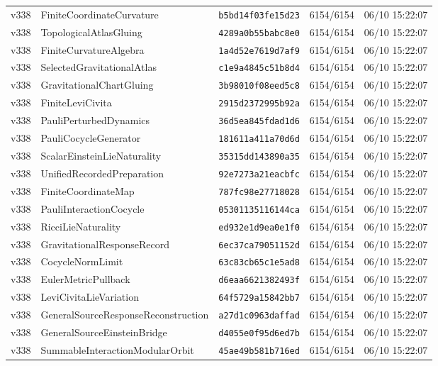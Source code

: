 \documentclass[11pt]{article}
\theoremstyle{definition}\newtheorem{deriv}{Derivação}
\begin{document}
{\begin{longtable}{@{}lllll@{}}
v338 & FiniteCoordinateCurvature & \texttt{b5bd14f03fe15d23} & 6154/6154 & 06/10 15:22:07 \\
v338 & TopologicalAtlasGluing & \texttt{4289a0b55babc8e0} & 6154/6154 & 06/10 15:22:07 \\
v338 & FiniteCurvatureAlgebra & \texttt{1a4d52e7619d7af9} & 6154/6154 & 06/10 15:22:07 \\
v338 & SelectedGravitationalAtlas & \texttt{c1e9a4845c51b8d4} & 6154/6154 & 06/10 15:22:07 \\
v338 & GravitationalChartGluing & \texttt{3b98010f08eed5c8} & 6154/6154 & 06/10 15:22:07 \\
v338 & FiniteLeviCivita & \texttt{2915d2372995b92a} & 6154/6154 & 06/10 15:22:07 \\
v338 & PauliPerturbedDynamics & \texttt{36d5ea845fdad1d6} & 6154/6154 & 06/10 15:22:07 \\
v338 & PauliCocycleGenerator & \texttt{181611a411a70d6d} & 6154/6154 & 06/10 15:22:07 \\
v338 & ScalarEinsteinLieNaturality & \texttt{35315dd143890a35} & 6154/6154 & 06/10 15:22:07 \\
v338 & UnifiedRecordedPreparation & \texttt{92e7273a21eacbfc} & 6154/6154 & 06/10 15:22:07 \\
v338 & FiniteCoordinateMap & \texttt{787fc98e27718028} & 6154/6154 & 06/10 15:22:07 \\
v338 & PauliInteractionCocycle & \texttt{05301135116144ca} & 6154/6154 & 06/10 15:22:07 \\
v338 & RicciLieNaturality & \texttt{ed932e1d9ea0e1f0} & 6154/6154 & 06/10 15:22:07 \\
v338 & GravitationalResponseRecord & \texttt{6ec37ca79051152d} & 6154/6154 & 06/10 15:22:07 \\
v338 & CocycleNormLimit & \texttt{63c83cb65c1e5ad8} & 6154/6154 & 06/10 15:22:07 \\
v338 & EulerMetricPullback & \texttt{d6eaa6621382493f} & 6154/6154 & 06/10 15:22:07 \\
v338 & LeviCivitaLieVariation & \texttt{64f5729a15842bb7} & 6154/6154 & 06/10 15:22:07 \\
v338 & GeneralSourceResponseReconstruction & \texttt{a27d1c0963daffad} & 6154/6154 & 06/10 15:22:07 \\
v338 & GeneralSourceEinsteinBridge & \texttt{d4055e0f95d6ed7b} & 6154/6154 & 06/10 15:22:07 \\
v338 & SummableInteractionModularOrbit & \texttt{45ae49b581b716ed} & 6154/6154 & 06/10 15:22:07 \\

\end{longtable}}
\end{document}
